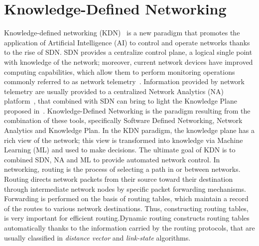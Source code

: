 \section{Knowledge-Defined Networking}
Knowledge-defined networking (KDN)~\cite{mestres2017knowledge} is a new paradigm that promotes the application of Artificial Intelligence (AI) to control and operate networks thanks to the rise of SDN. SDN provides a centralize control plane, a logical single point with knowledge of the network; moreover, current network devices have improved computing capabilities, which allow them to perform monitoring operations commonly referred to as network telemetry~\cite{kim2015band}. Information provided by network telemetry are usually provided to a centralized Network Analytics (NA) platform~\cite{clemm2015dna}, that combined with SDN can bring to light the Knowledge Plane proposed in~\cite{clark2003knowledge}. Knowledge-Defined Networking is the paradigm resulting from the combination of these tools, specifically Software Defined Networking, Network Analytics and Knowledge Plan. In the KDN paradigm, the knowledge plane has a rich view of the network; this view is transformed into knowledge via Machine Learning (ML) and used to make decisions. The ultimate goal of KDN is to combined SDN, NA and ML to provide automated network control.
%
In networking, routing is the process of selecting a path in or between networks. Routing directs network packets from their source toward their destination through intermediate network nodes by specific packet forwarding mechanisms. Forwarding is performed on the basis of routing tables, which maintain a record of the routes to various network destinations. Thus, constructing routing tables, is very important for efficient routing.Dynamic routing constructs routing tables automatically thanks to the information carried by the routing protocols, that are usually classified in \textit{distance vector} and \textit{link-state} algorithms.



